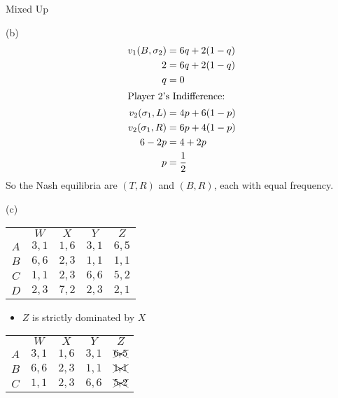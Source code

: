 \documentclass[8pt]{extarticle}
\begin{document}
\begin{problem}{Mixed Up}
\begin{problem}{(b)}
\begin{align*}
        v_1(B,\sigma_2) &= 6q + 2(1-q)\\
        2 &= 6q + 2(1-q)\\
        q &= 0\\
        \shortintertext{Player 2's Indifference:}
        v_2(\sigma_1,L) &= 4p + 6(1-p)\\
        v_2(\sigma_1,R) &= 6p + 4(1-p)\\
        6-2p &= 4 + 2p\\
        p &= \frac{1}{2}
      \end{align*}
      So the Nash equilibria are $(T,R)$ and $(B,R)$, each with equal frequency.
    \end{problem}
    \begin{problem}{(c)}
      \begin{center}
        \small
        \renewcommand{\arraystretch}{1.5}
        \begin{tabular}{c|c|c|c|c|}
          \multicolumn{1}{c}{} & \multicolumn{1}{c}{$W$} & \multicolumn{1}{c}{$X$} & \multicolumn{1}{c}{$Y$} & \multicolumn{1}{c}{$Z$}\\
          \cline{2-5}
          $A$ & $3,1$ & $1,6$ & $3,1$ & $6,5$ \\
          \cline{2-5}
          $B$ & $6,6$ & $2,3$ & $1,1$ & $1,1$ \\
          \cline{2-5}
          $C$ & $1,1$ & $2,3$ & $6,6$ & $5,2$ \\
          \cline{2-5}
          $D$ & $2,3$ & $7,2$ & $2,3$ & $2,1$\\
          \cline{2-5}
        \end{tabular}
      \end{center}
      \tcblower
      \begin{itemize}
        \item $Z$ is strictly dominated by $X$
      \end{itemize}
      \begin{center}
        \small
        \renewcommand{\arraystretch}{1.5}
        \begin{tabular}{c|c|c|c|c|}
          \multicolumn{1}{c}{} & \multicolumn{1}{c}{$W$} & \multicolumn{1}{c}{$X$} & \multicolumn{1}{c}{$Y$} & \multicolumn{1}{c}{$Z$}\\
          \cline{2-5}
          $A$ & $3,1$ & $1,6$ & $3,1$ & $\xcancel{6,5}$ \\
          \cline{2-5}
          $B$ & $6,6$ & $2,3$ & $1,1$ & $\xcancel{1,1}$ \\
          \cline{2-5}
          $C$ & $1,1$ & $2,3$ & $6,6$ & $\xcancel{5,2}$ \\

\end{tabular}
\end{center}
\end{problem}
\end{problem}
\end{document}
